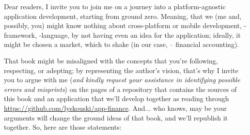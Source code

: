 
Dear readers, I invite you to join me on a journey into a platform-agnostic application development, starting from 
ground zero. Meaning, that we (me and, possibly, you) might know nothing about cross-platform or mobile development, 
-framework, -language, by not having even an idea for the application; ideally, it might 
be chosen a market, which to shake (in our case, -- financial accounting).

That book might be misaligned with the concepts that you're following, respecting, or adepting; by representing the 
author's vision, that's why I invite you to argue with me (\emph{and kindly request your assistance in identifying 
possible errors and misprints}) on the pages of a repository that contains the sources of this book and an application 
that we'll develop together as reading through 
\href{https://github.com/lyskouski/app-finance}{https://github.com/lyskouski/app-finance}. And... 
who knows, may be your arguments will change the ground ideas of that book, and we'll republish it together. 
So, here are those statements:

